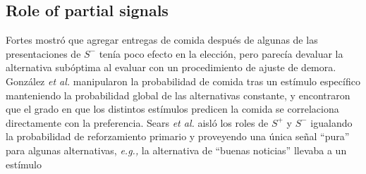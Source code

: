 \documentclass[a4paper,12pt]{article}
\begin{document}
\subsection{Role of partial signals}

Fortes mostró que agregar entregas de comida después de algunas de las presentaciones de $S^{-}$ tenía poco efecto en la elección, pero parecía devaluar la alternativa subóptima al evaluar con un procedimiento de ajuste de demora.
González {\itshape et al.} manipularon la probabilidad de comida tras un estímulo específico manteniendo la probabilidad global de las alternativas constante, y encontraron que el grado en que los distintos estímulos predicen la comida se correlaciona directamente con la preferencia.
Sears {\itshape et al.} aisló los roles de $S^{+}$ y $S^{-}$ igualando la probabilidad de reforzamiento primario y proveyendo una única señal ``pura'' para algunas alternativas, {\itshape e.g.,} la alternativa de ``buenas noticias'' llevaba a un estímulo
\end{document}
